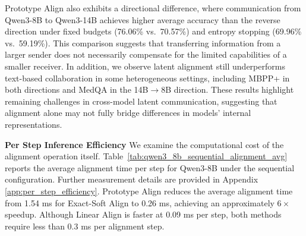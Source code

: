 \documentclass[11pt]{article}
\begin{document}
Prototype Align also exhibits a directional difference, where communication from Qwen3-8B to Qwen3-14B achieves higher average accuracy than the reverse direction under fixed budgets (76.06\% vs.\ 70.57\%) and entropy stopping (69.96\% vs.\ 59.19\%). This comparison suggests that transferring information from a larger sender does not necessarily compensate for the limited capabilities of a smaller receiver. In addition, we observe latent alignment still underperforms text-based collaboration in some heterogeneous settings, including MBPP+ in both directions and MedQA in the 14B$\rightarrow$8B direction. These results highlight remaining challenges in cross-model latent communication, suggesting that alignment alone may not fully bridge differences in models' internal representations.

\noindent\textbf{Per Step Inference Efficiency}
We examine the computational cost of the alignment operation itself. Table~\ref{tab:qwen3_8b_sequential_alignment_avg} reports the average alignment time per step for Qwen3-8B under the sequential configuration. Further measurement details are provided in Appendix \ref{app:per_step_efficiency}. Prototype Align reduces the average alignment time from 1.54 ms for Exact-Soft Align to 0.26 ms, achieving an approximately $6\times$ speedup. Although Linear Align is faster at 0.09 ms per step, both methods require less than 0.3 ms per alignment step.
\end{document}
